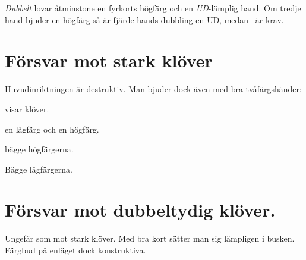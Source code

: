 {\em Dubbelt} lovar åtminstone en fyrkorts högfärg och en {\em
UD}-lämplig hand. Om tredje hand bjuder en högfärg så är fjärde hands
dubbling en UD, medan \pass\ är krav.

\section{Försvar mot stark klöver}

Huvudinriktningen  är destruktiv. Man bjuder dock även med bra
två\-färgs\-hän\-der:

\bbe
   \item[Dubbelt] visar klöver.
   \item[\NT{1}] en lågfärg och en högfärg.
   \item[\kl{2}] bägge högfärgerna.
   \item[\NT{2}] Bägge lågfärgerna.
\ebe

\section{Försvar mot dubbeltydig klöver.}

Ungefär som mot stark klöver. Med bra kort sätter man sig lämpligen i
busken. Färgbud på enläget dock konstruktiva.

